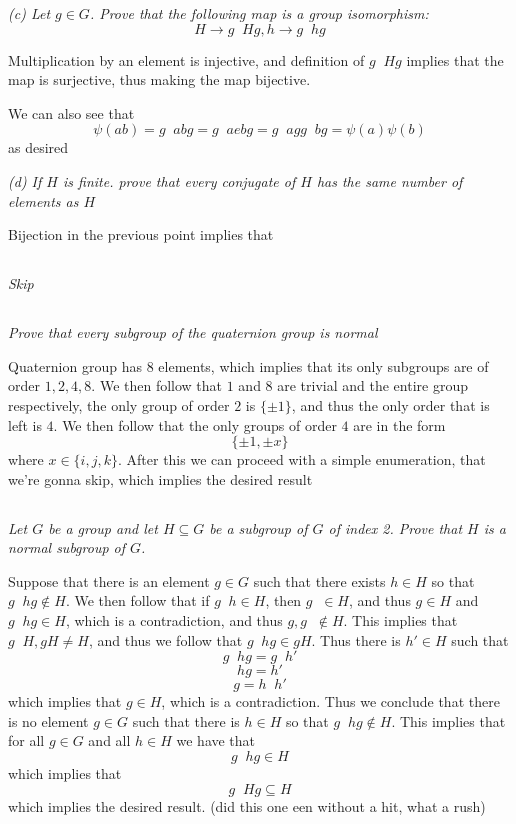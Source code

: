 \documentclass[11pt,oneside,titlepage]{book}
\DeclareMathOperator \inv {^{-1}}
\newcommand{\set}[1]{\{ #1 \}}
\begin{document}
\textit{(c) Let $g \in G$. Prove that the following map is a group
isomorphism:
  $$H \to g\inv H g, h \to g\inv h g$$
}

Multiplication by an element is injective, and definition of $g\inv H
g$ implies that the map is surjective, thus making the map bijective.

We can also see that
$$\psi(a b) = g\inv a b g = g \inv a e b g = g \inv a g g\inv  b g = \psi(a) \psi(b)$$
as desired

\textit{(d) If $H$ is finite. prove that every conjugate of $H$ has
the same number of elements as $H$}

Bijection in the previous point implies that

\subsection{}

\textit{Skip}

\subsection{}

\textit{Prove that every subgroup of the quaternion group is normal}

Quaternion group has $8$ elements, which implies that its only
subgroups are of order $1, 2, 4, 8$. We then follow that $1$ and $8$
are trivial and the entire group respectively, the only group of order
$2$ is $\set{\pm 1}$, and thus the only order that is left is $4$.  We
then follow that the only groups of order $4$ are in the form
$$\set{\pm 1, \pm x}$$
where $x \in \set{i, j, k}$. After this we can proceed with a simple
enumeration, that we're gonna skip, which implies the desired result

\subsection{}

\textit{Let $G$ be a group and let $H \subseteq G$ be a subgroup of
$G$ of index 2.  Prove that $H$ is a normal subgroup of $G$.}

Suppose that there is an element $g \in G$ such that there exists $h
\in H$ so that $g\inv h g \notin H$. We then follow that if $g\inv h
\in H$, then $g\inv \in H$, and thus $g \in H$ and $g\inv h g \in H$,
which is a contradiction, and thus $g, g\inv \notin H$. This implies
that $g\inv H, g H \neq H$, and thus we follow that $g\inv h g \in
gH$. Thus there is $h' \in H$ such that
$$g\inv h g = g\inv h'$$
$$h g = h'$$
$$g = h\inv h'$$
which implies that $g \in H$, which is a contradiction. Thus we
conclude that there is no element $g \in G$ such that there is $h \in
H$ so that $g\inv h g \notin H$. This implies that for all $g \in G$
and all $h \in H$ we have that
$$g\inv h g \in H$$
which implies that
$$g\inv H g \subseteq H$$
which implies the desired result. (did this one een without a hit,
what a rush)
\end{document}
